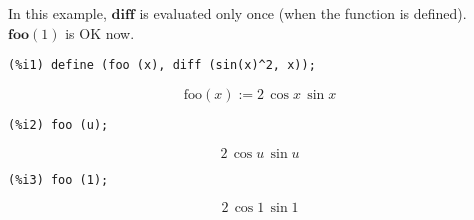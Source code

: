 \documentclass[12pt,leqno]{article}
\begin{document}
\begin{enumerate}
In this example, $\mathbf{diff}$ is evaluated only once (when the function is defined).
$\mathbf{foo} (1)$ is OK now.
\begin{verbatim}
(%i1) define (foo (x), diff (sin(x)^2, x));
\end{verbatim}
\begin{equation}
\mathrm{foo}\left(x\right):=2\,\cos x\,\sin x\tag{\%o1}
\label{eq:doc-group1-code27-1-1}
\end{equation}
\begin{verbatim}
(%i2) foo (u);
\end{verbatim}
\begin{equation}
2\,\cos u\,\sin u\tag{\%o2}
\label{eq:doc-group1-code27-2-1}
\end{equation}
\begin{verbatim}
(%i3) foo (1);
\end{verbatim}
\begin{equation}
2\,\cos 1\,\sin 1\tag{\%o3}
\label{eq:doc-group1-code27-3-1}
\end{equation}


\end{enumerate}
\end{document}
